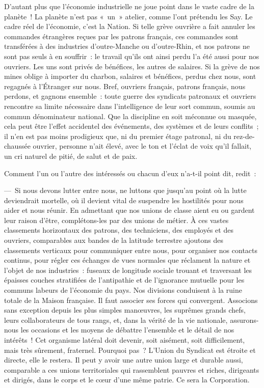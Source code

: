 \documentclass[french,twoside]{book} %
\begin{document}
D’autant plus que l’économie industrielle ne joue point dans le vaste cadre de la planète ! La planète n’est pas « un » atelier, comme l’ont prétendu les Say. Le cadre réel de l’économie, c’est la Nation. Si telle grève ouvrière a fait annuler les commandes étrangères reçues par les patrons français, ces commandes sont transférées à des industries d’outre-Manche ou d’outre-Rhin, et nos patrons ne sont pas seuls à en souffrir : le travail qu’ils ont ainsi perdu l’a été aussi pour nos ouvriers. Les uns sont privés de bénéfices, les autres de salaires. Si la grève de nos mines oblige à importer du charbon, salaires et bénéfices, perdus chez nous, sont regagnés à l’Étranger sur nous. Bref, ouvriers français, patrons français, nous perdons, et gagnons ensemble : toute guerre des syndicats patronaux et ouvriers rencontre sa limite nécessaire dans l’intelligence de leur sort commun, soumis au commun dénominateur national. Que la discipline en soit méconnue ou masquée, cela peut être l’effet accidentel des événements, des systèmes et de leurs conflits ; il n’en est pas moins prodigieux que, ni du premier étage patronal, ni du rez-de-chaussée ouvrier, personne n’ait élevé, avec le ton et l’éclat de voix qu’il fallait, un cri naturel de pitié, de salut et de paix.\par
Comment l’un ou l’autre des intéressés ou chacun d’eux n’a-t-il point dit, redit :\par
— Si nous devons lutter entre nous, ne luttons que jusqu’au point où la lutte deviendrait mortelle, où il devient vital de suspendre les hostilités pour nous aider et nous réunir. En admettant que nos unions de classe aient eu ou gardent leur raison d’être, complétons-les par des unions de métier. À ces vastes classements horizontaux des patrons, des techniciens, des employés et des ouvriers, comparables aux bandes de la latitude terrestre ajoutons des classements verticaux pour communiquer entre nous, pour organiser nos contacts continus, pour régler ces échanges de vues normales que réclament la nature et l’objet de nos industries : fuseaux de longitude sociale trouant et traversant les épaisses couches stratifiées de l’antipathie et de l’ignorance mutuelle pour les communs labeurs de l’économie du pays. Nos divisions conduisent à la ruine totale de la Maison française. Il faut associer ses forces qui convergent. Associons sans exception depuis les plus simples manœuvres, les suprêmes grands chefs, leurs collaborateurs de tous rangs, et, dans la vérité de la vie nationale, assurons-nous les occasions et les moyens de débattre l’ensemble et le détail de nos intérêts ! Cet organisme latéral doit devenir, soit aisément, soit difficilement, mais très sûrement, fraternel. Pourquoi pas ? L’Union du Syndicat est étroite et directe, elle le restera. Il peut y avoir une autre union large et durable aussi, comparable a ces unions territoriales qui rassemblent pauvres et riches, dirigeants et dirigés, dans le corps et le cœur d’une même patrie. Ce sera la Corporation.\par
\end{document}
